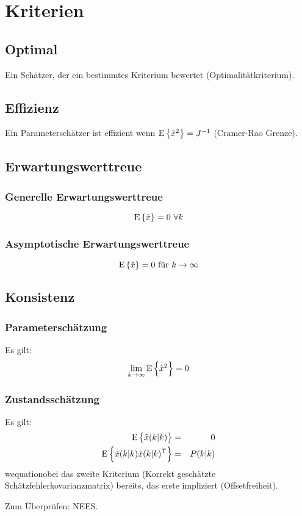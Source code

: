 \chapter{Kriterien}
\section{Optimal}
Ein Schätzer, der ein bestimmtes Kriterium bewertet (Optimalitätkriterium).

\section{Effizienz}
Ein Parameterschätzer ist effizient wenn $\operatorname*{E}\left\{\tilde{x}^2\right\} = J^{-1}$ (Cramer-Rao Grenze).

\section{Erwartungswerttreue}
\subsection{Generelle Erwartungswerttreue}
\begin{equation*}
    \operatorname*{E}\left\{\tilde{x}\right\} = 0\ \forall k
\end{equation*}

\subsection{Asymptotische Erwartungswerttreue}
\begin{equation*}
    \operatorname*{E}\left\{\tilde{x}\right\} = 0\ \text{für } k \to \infty
\end{equation*}

\section{Konsistenz}
\subsection{Parameterschätzung}
Es gilt:
\begin{equation*}
    \lim_{k \to \infty} \operatorname*{E}\left\{\tilde{x}^2\right\} = 0
\end{equation*}

\subsection{Zustandsschätzung}
Es gilt:
\begin{eqnarray*}
    \operatorname*{E}\left\{\tilde{x}(k|k)\right\} &=& 0 \\
    \operatorname*{E}\left\{\tilde{x}(k|k) \tilde{x}(k|k)^\text{T}\right\} &=& P(k|k)
\end{eqnarray*}
wequationobei das zweite Kriterium (Korrekt geschätzte Schätzfehlerkovarianzmatrix) bereits, das erste impliziert (Offsetfreiheit).

Zum Überprüfen: NEES.
